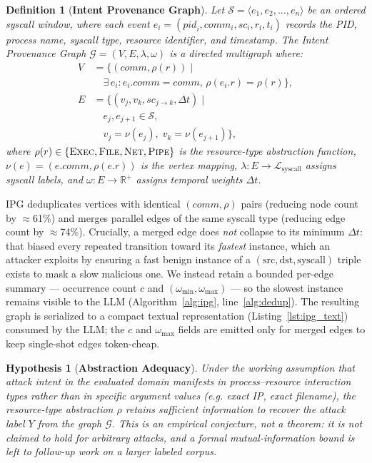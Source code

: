 \documentclass[journal]{IEEEtran}
\newtheorem{definition}{Definition}
\newtheorem{hypothesis}{Hypothesis}
\newcommand{\ipg}{IPG}
\newcommand{\eg}{\textit{e.g.}}
\begin{document}
\begin{definition}[\textbf{Intent Provenance Graph}]
Let $\mathcal{S} = \langle e_1, e_2, \ldots, e_n \rangle$ be an ordered
syscall window, where each event
$e_i = (\textit{pid}_i, \textit{comm}_i, \textit{sc}_i, r_i, t_i)$
records the PID, process name, syscall type, resource identifier, and
timestamp.  The \emph{Intent Provenance Graph}
$\mathcal{G} = (V, E, \lambda, \omega)$ is a directed multigraph where:
\begin{align}
V &= \{(\textit{comm}, \rho(r)) \mid\nonumber\\
    &\quad \exists\, e_i : e_i.\textit{comm} = \textit{comm},\,
       \rho(e_i.r) = \rho(r)\}, \label{eq:vertices}\\
E &= \{(v_j, v_k, \textit{sc}_{j{\to}k}, \Delta t)\!\mid\nonumber\\
    &\quad e_j, e_{j+1} \in \mathcal{S},\nonumber\\
    &\quad v_j{=}\nu(e_j),\; v_k{=}\nu(e_{j+1})\}, \label{eq:edges}
\end{align}
where $\rho(r) \in \{\textsc{Exec}, \textsc{File}, \textsc{Net},
\textsc{Pipe}\}$ is the resource-type abstraction function,
$\nu(e) = (e.\textit{comm}, \rho(e.r))$ is the vertex mapping,
$\lambda : E \to \mathcal{L}_{\text{syscall}}$ assigns syscall labels,
and $\omega : E \to \mathbb{R}^{+}$ assigns temporal weights $\Delta t$.
\end{definition}

\ipg{} deduplicates vertices with identical $(\textit{comm}, \rho)$ pairs
(reducing node count by $\approx$61\%) and merges parallel edges of the same
syscall type (reducing edge count by $\approx$74\%).  Crucially, a merged
edge does \emph{not} collapse to its minimum $\Delta t$: that biased every
repeated transition toward its \emph{fastest} instance, which an attacker
exploits by ensuring a fast benign instance of a $(\text{src},\text{dst},
\text{syscall})$ triple exists to mask a slow malicious one.  We instead
retain a bounded per-edge summary --- occurrence count $c$ and
$(\omega_{\min},\omega_{\max})$ --- so the slowest instance remains visible
to the LLM (Algorithm~\ref{alg:ipg}, line~\ref{alg:dedup}).  The resulting
graph is serialized to a compact textual representation
(Listing~\ref{lst:ipg_text}) consumed by the LLM; the $c$ and
$\omega_{\max}$ fields are emitted only for merged edges to keep single-shot
edges token-cheap.

\begin{hypothesis}[\textbf{Abstraction Adequacy}]\label{thm:info}
Under the working assumption that attack intent in the evaluated domain
manifests in process--resource interaction \emph{types} rather than in
specific argument values (\eg{} exact IP, exact filename), the resource-type
abstraction $\rho$ retains sufficient information to recover the attack label
$Y$ from the graph $\mathcal{G}$.  This is an empirical conjecture, not a
theorem: it is \emph{not} claimed to hold for arbitrary attacks, and a formal
mutual-information bound is left to follow-up work on a larger labeled corpus.
\end{hypothesis}
\end{document}
